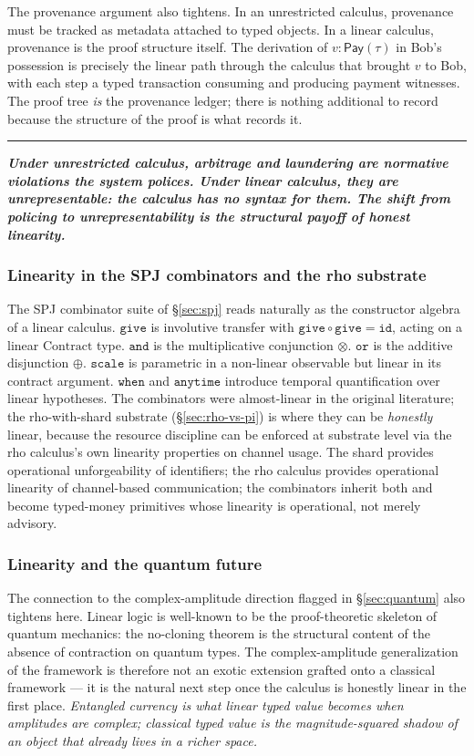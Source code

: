 \documentclass[11pt]{article}
\newcommand{\position}[1]{%
  \medskip
  \begin{quoting}[indentfirst=false, leftmargin=1em, rightmargin=1em]
  \noindent\textcolor{rhosky}{\rule{3pt}{1.2em}}\hspace{0.5em}\textbf{\textit{#1}}
  \end{quoting}
  \medskip
}
\newcommand{\Pay}{\mathsf{Pay}}
\begin{document}
The provenance argument also tightens. In an unrestricted calculus, provenance must be tracked as metadata attached to typed objects. In a linear calculus, provenance is the proof structure itself. The derivation of $v : \Pay(\tau)$ in Bob's possession is precisely the linear path through the calculus that brought $v$ to Bob, with each step a typed transaction consuming and producing payment witnesses. The proof tree \emph{is} the provenance ledger; there is nothing additional to record because the structure of the proof is what records it.

\position{Under unrestricted calculus, arbitrage and laundering are normative violations the system polices. Under linear calculus, they are unrepresentable: the calculus has no syntax for them. The shift from policing to unrepresentability is the structural payoff of honest linearity.}

\subsubsection*{Linearity in the SPJ combinators and the rho substrate}

The SPJ combinator suite of \S\ref{sec:spj} reads naturally as the constructor algebra of a linear calculus. $\texttt{give}$ is involutive transfer with $\texttt{give} \circ \texttt{give} = \texttt{id}$, acting on a linear $\text{Contract}$ type. $\texttt{and}$ is the multiplicative conjunction $\otimes$. $\texttt{or}$ is the additive disjunction $\oplus$. $\texttt{scale}$ is parametric in a non-linear observable but linear in its contract argument. $\texttt{when}$ and $\texttt{anytime}$ introduce temporal quantification over linear hypotheses. The combinators were almost-linear in the original literature; the rho-with-shard substrate (\S\ref{sec:rho-vs-pi}) is where they can be \emph{honestly} linear, because the resource discipline can be enforced at substrate level via the rho calculus's own linearity properties on channel usage. The shard provides operational unforgeability of identifiers; the rho calculus provides operational linearity of channel-based communication; the combinators inherit both and become typed-money primitives whose linearity is operational, not merely advisory.

\subsubsection*{Linearity and the quantum future}

The connection to the complex-amplitude direction flagged in \S\ref{sec:quantum} also tightens here. Linear logic is well-known to be the proof-theoretic skeleton of quantum mechanics: the no-cloning theorem is the structural content of the absence of contraction on quantum types. The complex-amplitude generalization of the framework is therefore not an exotic extension grafted onto a classical framework --- it is the natural next step once the calculus is honestly linear in the first place. \emph{Entangled currency is what linear typed value becomes when amplitudes are complex; classical typed value is the magnitude-squared shadow of an object that already lives in a richer space.}
\end{document}
